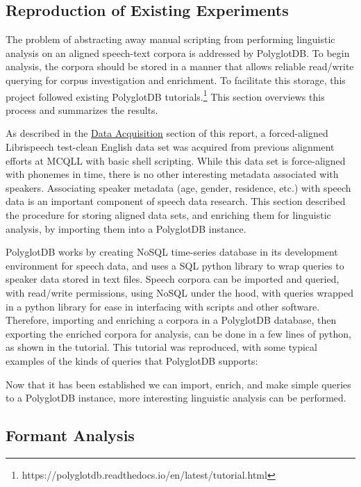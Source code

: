 \documentclass[11pt]{article}
\begin{document}
\subsection{Reproduction of Existing Experiments}

The problem of abstracting away manual scripting from performing linguistic analysis on an aligned speech-text corpora is addressed by PolyglotDB. To begin analysis, the corpora should be stored in a manner that allows reliable read/write querying for corpus investigation and enrichment. To facilitate this storage, this project followed existing PolyglotDB tutorials.\footnote{https://polyglotdb.readthedocs.io/en/latest/tutorial.html} This section overviews this process and summarizes the results.

As described in the \hyperlink{section.22}{Data Acquisition} section of this report, a forced-aligned Librispeech test-clean English data set was acquired from previous alignment efforts at MCQLL with basic shell scripting. While this data set is force-aligned with phonemes in time, there is no other interesting metadata associated with speakers. Associating speaker metadata (age, gender, residence, etc.) with speech data is an important component of speech data research. This section described the procedure for storing aligned data sets, and enriching them for linguistic analysis, by importing them into a PolyglotDB instance. 

PolyglotDB works by creating NoSQL time-series database in its development environment for speech data, and uses a SQL python library to wrap queries to speaker data stored in text files. Speech corpora can be imported and queried, with read/write permissions, using NoSQL under the hood, with queries wrapped in a python library for ease in interfacing with scripts and other software. Therefore, importing and enriching a corpora in a PolyglotDB database, then exporting the enriched corpora for analysis, can be done in a few lines of python, as shown in the tutorial. This tutorial was reproduced, with some typical examples of the kinds of queries that PolyglotDB supports:


Now that it has been established we can import, enrich, and make simple queries to a PolyglotDB instance, more interesting linguistic analysis can be performed.

\subsection{Formant Analysis}
\end{document}
